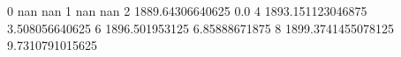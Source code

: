 0 nan nan
1 nan nan
2 1889.64306640625 0.0
4 1893.151123046875 3.508056640625
6 1896.501953125 6.85888671875
8 1899.3741455078125 9.7310791015625
